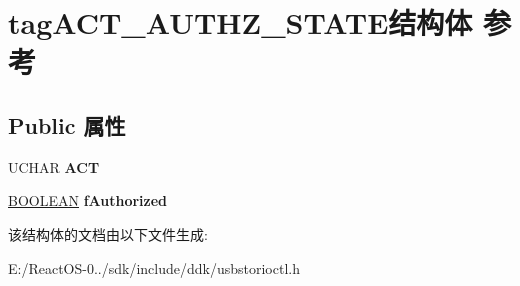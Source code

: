 \hypertarget{structtag_a_c_t___a_u_t_h_z___s_t_a_t_e}{}\section{tag\+A\+C\+T\+\_\+\+A\+U\+T\+H\+Z\+\_\+\+S\+T\+A\+T\+E结构体 参考}
\label{structtag_a_c_t___a_u_t_h_z___s_t_a_t_e}
\subsection*{Public 属性}
\begin{DoxyCompactItemize}
\item 
\mbox{\label{structtag_a_c_t___a_u_t_h_z___s_t_a_t_e_aadc48362a7998f1d19c286ab87a1e484}} 
U\+C\+H\+AR {\bfseries A\+CT}
\item 
\mbox{\label{structtag_a_c_t___a_u_t_h_z___s_t_a_t_e_a246c43e9ffc195aebe16348db4168af3}} 
\hyperlink{_processor_bind_8h_a112e3146cb38b6ee95e64d85842e380a}{B\+O\+O\+L\+E\+AN} {\bfseries f\+Authorized}
\end{DoxyCompactItemize}


该结构体的文档由以下文件生成\+:\begin{DoxyCompactItemize}
\item 
E\+:/\+React\+O\+S-\/0../sdk/include/ddk/usbstorioctl.\+h\end{DoxyCompactItemize}
